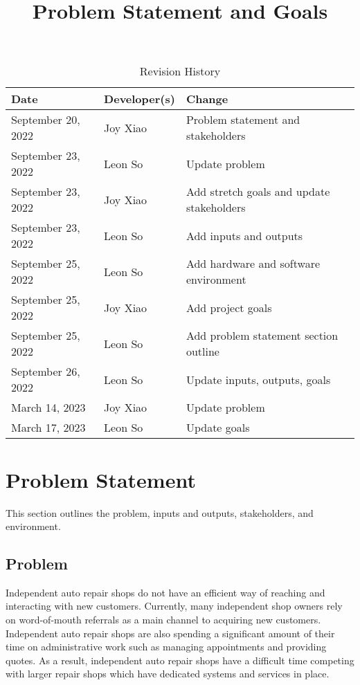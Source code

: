 \documentclass{article}
\title{Problem Statement and Goals\\\progname}
\author{\authname}
\date{}
\begin{document}
\maketitle

\begin{table}[hp]
	\caption{Revision History} \label{TblRevisionHistory}
	\begin{tabularx}{\textwidth}{llX}
		\toprule
		\textbf{Date}      & \textbf{Developer(s)} & \textbf{Change}                           \\
		\midrule
		September 20, 2022 & Joy Xiao              & Problem statement and stakeholders        \\
		September 23, 2022 & Leon So               & Update problem                            \\
		September 23, 2022 & Joy Xiao              & Add stretch goals and update stakeholders \\
		September 23, 2022 & Leon So               & Add inputs and outputs                    \\
		September 25, 2022 & Leon So               & Add hardware and software environment     \\
		September 25, 2022 & Joy Xiao              & Add project goals                         \\
		September 25, 2022 & Leon So               & Add problem statement section outline     \\
		September 26, 2022 & Leon So               & Update inputs, outputs, goals             \\
		March 14, 2023     & Joy Xiao              & Update problem                            \\
		March 17, 2023     & Leon So               & Update goals                              \\
		\bottomrule
	\end{tabularx}
\end{table}

\section{Problem Statement}
This section outlines the problem, inputs and outputs, stakeholders, and environment.

\subsection{Problem}
Independent auto repair shops do not have an efficient way of reaching and interacting with new
customers. Currently, many independent shop owners rely on word-of-mouth referrals as a main
channel to acquiring new customers. Independent auto repair shops are also spending a significant
amount of their time on administrative work such as managing appointments and providing quotes. As
a result, independent auto repair shops have a difficult time competing with larger repair shops
which have dedicated systems and services in place.\\
\end{document}
